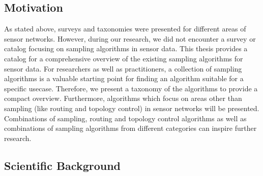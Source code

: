 
\subsection{Motivation}
\label{sec:motivation}

As stated above, surveys and taxonomies were presented for different areas of
sensor networks. However, during our research, we did not encounter a survey or
catalog focusing on sampling algorithms in sensor data. This thesis provides a
catalog for a comprehensive overview of the existing sampling algorithms for
sensor data. For researchers as well as practitioners, a collection of sampling
algorithms is a valuable starting point for finding an algorithm suitable for a
specific usecase. Therefore, we present a taxonomy of the algorithms to provide
a compact overview. Furthermore, algorithms which focus on areas other than
sampling (like routing and topology control) in sensor networks will be
presented. Combinations of sampling, routing and topology control algorithms as
well as combinations of sampling algorithms from different categories can
inspire further research.


\subsection{Scientific Background}
\label{sec:Scientific Background}

